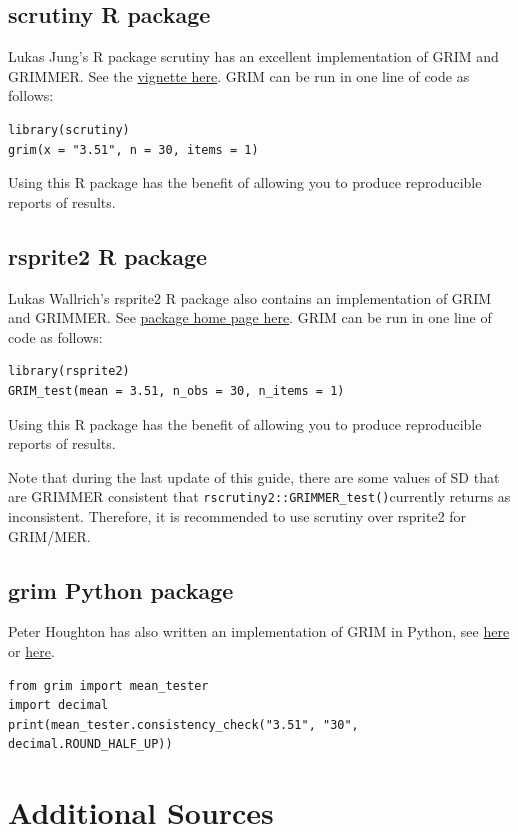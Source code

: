 \documentclass[letterpaper, 12pt]{article}
\begin{document}
{\subsection*{{scrutiny} R package}

Lukas Jung's R package {scrutiny} has an excellent implementation of GRIM and GRIMMER. See the \href{https://cran.r-project.org/web/packages/scrutiny/vignettes/grim.html}{vignette here}. GRIM can be run in one line of code as follows: 
\begin{verbatim}
library(scrutiny)
grim(x = "3.51", n = 30, items = 1)
\end{verbatim}
Using this R package has the benefit of allowing you to produce reproducible reports of results.

\subsection*{{rsprite2} R package}

Lukas Wallrich's {rsprite2} R package also contains an implementation of GRIM and GRIMMER. See \href{https://lukaswallrich.github.io/rsprite2}{package home page here}. GRIM can be run in one line of code as follows: 
\begin{verbatim}
library(rsprite2)
GRIM_test(mean = 3.51, n_obs = 30, n_items = 1)
\end{verbatim}
Using this R package has the benefit of allowing you to produce reproducible reports of results.

Note that during the last update of this guide, there are some values of SD that are GRIMMER consistent that \texttt{rscrutiny2::GRIMMER\_test()}currently returns as inconsistent. Therefore, it is recommended to use scrutiny over rsprite2 for GRIM/MER.

\subsection*{{grim} Python package}

Peter Houghton has also written an implementation of GRIM in Python, see \href{https://github.com/phoughton/grim_test}{here} or \href{https://pypi.org/project/grim/}{here}.
\begin{verbatim}
from grim import mean_tester
import decimal
print(mean_tester.consistency_check("3.51", "30", decimal.ROUND_HALF_UP))
\end{verbatim}

\section*{Additional Sources}
}
\end{document}

